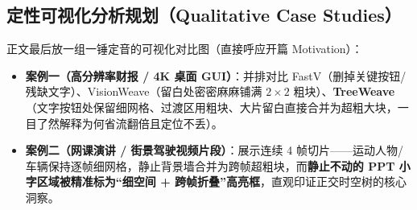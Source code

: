 \documentclass[11pt,a4paper]{ctexart}
\begin{document}
\subsection{定性可视化分析规划（Qualitative Case Studies）}
正文最后放一组一锤定音的可视化对比图（直接呼应开篇 Motivation）：
\begin{itemize}[leftmargin=1.5em, itemsep=3pt]
  \item \textbf{案例一（高分辨率财报 / 4K 桌面 GUI）}：并排对比 FastV（删掉关键按钮/残缺文字）、VisionWeave（留白处密密麻麻铺满 $2{\times}2$ 粗块）、\textbf{TreeWeave}（文字按钮处保留细网格、过渡区用粗块、大片留白直接合并为超粗大块，一目了然解释为何省流翻倍且定位不丢）。
  \item \textbf{案例二（网课演讲 / 街景驾驶视频片段）}：展示连续 4 帧切片——运动人物/车辆保持逐帧细网格，静止背景墙合并为跨帧超粗块，而\textbf{静止不动的 PPT 小字区域被精准标为``细空间 + 跨帧折叠''高亮框}，直观印证正交时空树的核心洞察。
\end{itemize}
\end{document}
